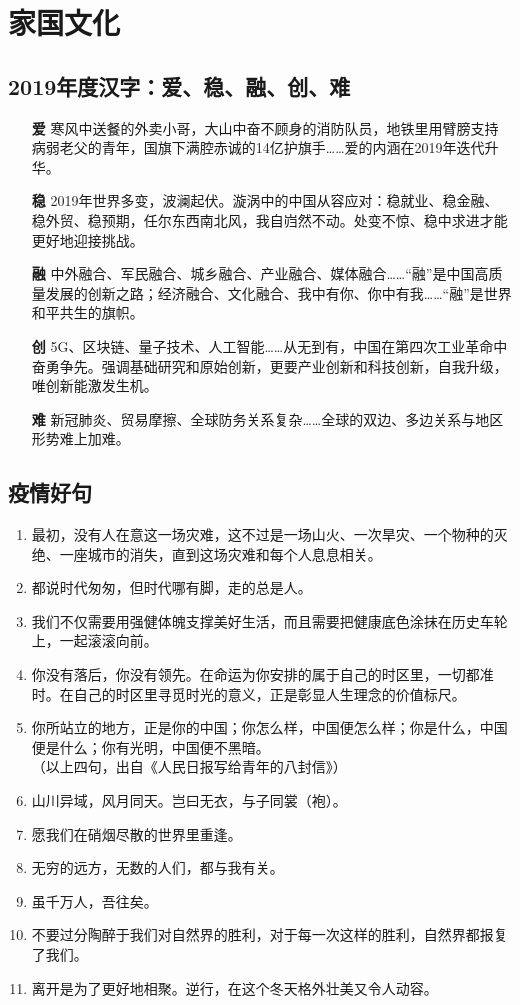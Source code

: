 \chapter{家国文化}

\section{2019年度汉字：爱、稳、融、创、难}
\begin{enumerate}
\item[\textbf{爱}] 寒风中送餐的外卖小哥，大山中奋不顾身的消防队员，地铁里用臂膀支持病弱老父的青年，国旗下满腔赤诚的14亿护旗手……爱的内涵在2019年迭代升华。
\item[\textbf{稳}] 2019年世界多变，波澜起伏。漩涡中的中国从容应对：稳就业、稳金融、稳外贸、稳预期，任尔东西南北风，我自岿然不动。处变不惊、稳中求进才能更好地迎接挑战。
\item[\textbf{融}] 中外融合、军民融合、城乡融合、产业融合、媒体融合……“融”是中国高质量发展的创新之路；经济融合、文化融合、我中有你、你中有我……“融”是世界和平共生的旗帜。
\item[\textbf{创}] 5G、区块链、量子技术、人工智能……从无到有，中国在第四次工业革命中奋勇争先。强调基础研究和原始创新，更要产业创新和科技创新，自我升级，唯创新能激发生机。
\item[\textbf{难}] 新冠肺炎、贸易摩擦、全球防务关系复杂……全球的双边、多边关系与地区形势难上加难。
\end{enumerate}

\section{疫情好句}
\begin{enumerate}
\item 最初，没有人在意这一场灾难，这不过是一场山火、一次旱灾、一个物种的灭绝、一座城市的消失，直到这场灾难和每个人息息相关。
\item 都说时代匆匆，但时代哪有脚，走的总是人。
\item 我们不仅需要用强健体魄支撑美好生活，而且需要把健康底色涂抹在历史车轮上，一起滚滚向前。
\item 你没有落后，你没有领先。在命运为你安排的属于自己的时区里，一切都准时。在自己的时区里寻觅时光的意义，正是彰显人生理念的价值标尺。
\item 你所站立的地方，正是你的中国；你怎么样，中国便怎么样；你是什么，中国便是什么；你有光明，中国便不黑暗。\\
（以上四句，出自《人民日报写给青年的八封信》）
\item 山川异域，风月同天。岂曰无衣，与子同裳（袍）。
\item 愿我们在硝烟尽散的世界里重逢。
\item 无穷的远方，无数的人们，都与我有关。
\item 虽千万人，吾往矣。
\item 不要过分陶醉于我们对自然界的胜利，对于每一次这样的胜利，自然界都报复了我们。
\item 离开是为了更好地相聚。逆行，在这个冬天格外壮美又令人动容。
\end{enumerate}


